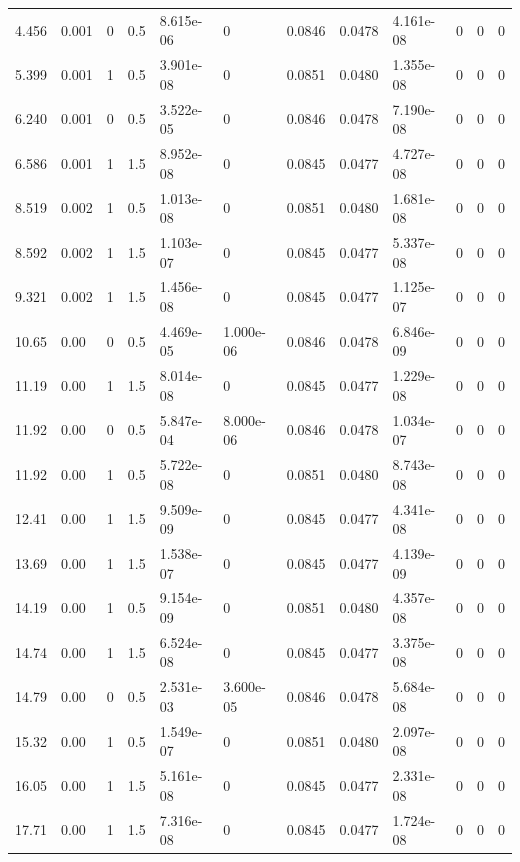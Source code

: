 \documentclass[preview]{standalone}
\begin{document}
{{\begin{tabular}{L{1.2cm}C{1.2cm} C{0.3cm}C{0.5cm} C{1.4cm}C{1.4cm} C{1.4cm}C{1.4cm} C{1.6cm}C{1.6cm} C{1.6cm}C{1.6cm}}
  4.456  &  0.001  & 0     & 0.5 &  8.615e-06  & 0  &  0.0846&   0.0478& 4.161e-08 & 0   &  0 & 0  \\ 
  5.399  &  0.001  & 1     & 0.5 &  3.901e-08  & 0  &  0.0851&   0.0480& 1.355e-08 & 0   &  0 & 0  \\ 
  6.240  &  0.001  & 0     & 0.5 &  3.522e-05  & 0  &  0.0846&   0.0478& 7.190e-08 & 0   &  0 & 0  \\ 
  6.586  &  0.001  & 1     & 1.5 &  8.952e-08  & 0  &  0.0845&   0.0477& 4.727e-08 & 0   &  0 & 0  \\ 
  8.519  &  0.002  & 1     & 0.5 &  1.013e-08  & 0  &  0.0851&   0.0480& 1.681e-08 & 0   &  0 & 0  \\ 
  8.592  &  0.002  & 1     & 1.5 &  1.103e-07  & 0  &  0.0845&   0.0477& 5.337e-08 & 0   &  0 & 0  \\ 
  9.321  &  0.002  & 1     & 1.5 &  1.456e-08  & 0  &  0.0845&   0.0477& 1.125e-07 & 0   &  0 & 0  \\ 
  10.65  &  0.00  & 0     & 0.5 &  4.469e-05  & 1.000e-06  &  0.0846&   0.0478& 6.846e-09 & 0   &  0 & 0  \\ 
  11.19  &  0.00  & 1     & 1.5 &  8.014e-08  & 0  &  0.0845&   0.0477& 1.229e-08 & 0   &  0 & 0  \\ 
  11.92  &  0.00  & 0     & 0.5 &  5.847e-04  & 8.000e-06  &  0.0846&   0.0478& 1.034e-07 & 0   &  0 & 0  \\ 
  11.92  &  0.00  & 1     & 0.5 &  5.722e-08  & 0  &  0.0851&   0.0480& 8.743e-08 & 0   &  0 & 0  \\ 
  12.41  &  0.00  & 1     & 1.5 &  9.509e-09  & 0  &  0.0845&   0.0477& 4.341e-08 & 0   &  0 & 0  \\ 
  13.69  &  0.00  & 1     & 1.5 &  1.538e-07  & 0  &  0.0845&   0.0477& 4.139e-09 & 0   &  0 & 0  \\ 
  14.19  &  0.00  & 1     & 0.5 &  9.154e-09  & 0  &  0.0851&   0.0480& 4.357e-08 & 0   &  0 & 0  \\ 
  14.74  &  0.00  & 1     & 1.5 &  6.524e-08  & 0  &  0.0845&   0.0477& 3.375e-08 & 0   &  0 & 0  \\ 
  14.79  &  0.00  & 0     & 0.5 &  2.531e-03  & 3.600e-05  &  0.0846&   0.0478& 5.684e-08 & 0   &  0 & 0  \\ 
  15.32  &  0.00  & 1     & 0.5 &  1.549e-07  & 0  &  0.0851&   0.0480& 2.097e-08 & 0   &  0 & 0  \\ 
  16.05  &  0.00  & 1     & 1.5 &  5.161e-08  & 0  &  0.0845&   0.0477& 2.331e-08 & 0   &  0 & 0  \\ 
  17.71  &  0.00  & 1     & 1.5 &  7.316e-08  & 0  &  0.0845&   0.0477& 1.724e-08 & 0   &  0 & 0  \\ 

\end{tabular}}}
\end{document}
